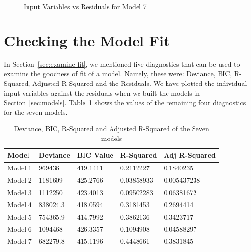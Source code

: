 \documentclass[a4paper,12pt, english]{article}
\begin{document}
\begin{figure}[H]
        \caption{Input Variables vs Residuals for Model 7}
        \label{fig:mod7-resids}
\end{figure}


\section{Checking the Model Fit}\label{sec:checkmodelfit}
In Section~\ref{sec:examine-fit}, we mentioned five diagnostics that can be used to examine the goodness of fit of a model. Namely, these were: Deviance, BIC, R-Squared, Adjusted R-Squared and the Residuals. We have plotted the individual input variables against the residuals when we built the models in Section~\ref{sec:models}. Table~\ref{table:checkfit} shows the values of the remaining four diagnostics for the seven models.  



\begin{table}[H]
\centering
    \begin{tabular}{ | l | l | l |  l | l |}
    \hline
    Model & Deviance & BIC Value & R-Squared & Adj R-Squared \\ \hline
    Model 1 & 969436 & 419.1411 & 0.2112227 & 0.1840235 \\ \hline
    Model 2 & 1181609 & 425.2766 & 0.03858933 & 0.005437238 \\ \hline
    Model 3 & 1112250 & 423.4013 & 0.09502283 & 0.06381672 \\ \hline
    Model 4 & 838024.3 & 418.0594 &  0.3181453 &  0.2694414 \\ \hline
    Model 5 & 754365.9 & 414.7992 &  0.3862136 &  0.3423717 \\ \hline
    
    Model 6 & 1094468 & 426.3357 &  0.1094908 &  0.04588297 \\ \hline
    Model 7 & 682279.8 &  415.1196 &  0.4448661 &  0.3831845 \\ \hline
    \end{tabular}    
    \caption{Deviance, BIC, R-Squared and Adjusted R-Squared of the Seven models}
    \label{table:checkfit}
\end{table}
\end{document}
